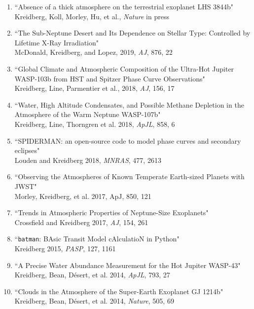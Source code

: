 \documentclass[11pt]{article}
\begin{document}
\begin{enumerate}
\item ``Absence of a thick atmosphere on the terrestrial exoplanet LHS 3844b"\\ 
Kreidberg, Koll, Morley, Hu, et al., \textit{Nature} in press

\item``The Sub-Neptune Desert and Its Dependence on Stellar Type: Controlled by Lifetime X-Ray Irradiation"\\
McDonald, Kreidberg, and Lopez, 2019, \textit{AJ}, 876, 22

\item ``Global Climate and Atmospheric Composition of the Ultra-Hot Jupiter WASP-103b from HST and Spitzer Phase Curve Observations"\\
Kreidberg, Line, Parmentier et al., 2018, \textit{AJ}, 156, 17


\item ``Water, High Altitude Condensates, and Possible Methane Depletion in the Atmosphere of the Warm Neptune WASP-107b"\\
Kreidberg, Line, Thorngren et al. 2018, \textit{ApJL}, 858, 6 

\item ``SPIDERMAN: an open-source code to model phase curves and secondary eclipses"\\
Louden and Kreidberg 2018, \textit{MNRAS}, 477, 2613 

\item ``Observing the Atmospheres of Known Temperate Earth-sized Planets with JWST"\\
Morley, Kreidberg, et al. 2017, ApJ, 850, 121 
    
\item ``Trends in Atmospheric Properties of Neptune-Size Exoplanets"\\
Crossfield and Kreidberg 2017, \textit{AJ}, 154, 261 

\item ``\texttt{batman}: BAsic Transit Model cAlculatioN in Python"\\
Kreidberg 2015, \textit{PASP}, 127, 1161 

\item ``A Precise Water Abundance Measurement for the Hot Jupiter WASP-43"\\
Kreidberg, Bean, D\'esert, et al. 2014, \textit{ApJL}, 793, 27


\item ``Clouds in the Atmosphere of the Super-Earth Exoplanet GJ 1214b"\\
Kreidberg, Bean, D\'esert, et al. 2014, \textit{Nature}, 505, 69

\end{enumerate}
\end{document}
